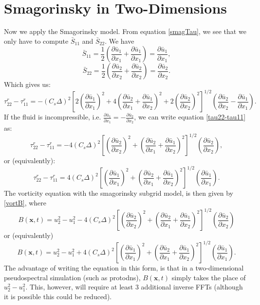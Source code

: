 \documentclass[11pt,a4paper]{article}
\begin{document}
\section{Smagorinsky in Two-Dimensions}
Now we apply the Smagorinsky model. From equation \ref{smagTau}, we see that we only have to compute $\bar{S}_{11}$ and $\bar{S}_{22}$. We have 
$$\bar{S}_{11} = \frac{1}{2}\left( \frac{\partial \bar{u}_1}{\partial x_1} + \frac{\partial \bar{u}_1}{\partial x_1}\right) = \frac{\partial \bar{u}_1}{\partial x_1},$$
$$\bar{S}_{22} = \frac{1}{2}\left( \frac{\partial \bar{u}_2}{\partial x_2} + \frac{\partial \bar{u}_2}{\partial x_2}\right) = \frac{\partial \bar{u}_2}{\partial x_2}.$$
Which gives us:
\begin{equation}\label{tau22-tau11}
\tau_{22}^r - \tau_{11}^r= -(C_s \Delta)^2\left[2\left( \frac{\partial \bar{u}_1}{\partial x_1}\right)^2+4\left( \frac{\partial \bar{u}_2}{\partial x_1} + \frac{\partial \bar{u}_1}{\partial x_2}\right)^2+2\left( \frac{\partial \bar{u}_2}{\partial x_2}\right)^2 \right]^{1/2}\left(\frac{\partial \bar{u}_2}{\partial x_2} - \frac{\partial \bar{u}_1}{\partial x_1}\right).
\end{equation}
If the fluid is incompressible, i.e. $\frac{\partial \bar{u}_1}{\partial x_1} = -\frac{\partial \bar{u}_2}{\partial x_2}$, we can write equation \ref{tau22-tau11} as:
$$\tau_{22}^r - \tau_{11}^r= -4(C_s \Delta)^2\left[\left( \frac{\partial \bar{u}_2}{\partial x_2}\right)^2+\left( \frac{\partial \bar{u}_2}{\partial x_1} + \frac{\partial \bar{u}_1}{\partial x_2}\right)^2 \right]^{1/2}\left(\frac{\partial \bar{u}_2}{\partial x_2}\right),$$
or (equivalently):
$$\tau_{22}^r - \tau_{11}^r= 4(C_s \Delta)^2\left[\left( \frac{\partial \bar{u}_1}{\partial x_1}\right)^2+\left( \frac{\partial \bar{u}_2}{\partial x_1} + \frac{\partial \bar{u}_1}{\partial x_2}\right)^2 \right]^{1/2}\left(\frac{\partial \bar{u}_1}{\partial x_1}\right).$$
The vorticity equation with the smagorinsky subgrid model, is then given by \ref{vortB}, where
$$B(\boldsymbol{x}, t) = u_2^2-u_1^2-4(C_s \Delta)^2\left[\left( \frac{\partial \bar{u}_2}{\partial x_2}\right)^2+\left( \frac{\partial \bar{u}_2}{\partial x_1} + \frac{\partial \bar{u}_1}{\partial x_2}\right)^2 \right]^{1/2}\left(\frac{\partial \bar{u}_2}{\partial x_2}\right)$$
or (equivalently)
$$B(\boldsymbol{x}, t) = u_2^2-u_1^2+4(C_s \Delta)^2\left[\left( \frac{\partial \bar{u}_1}{\partial x_1}\right)^2+\left( \frac{\partial \bar{u}_2}{\partial x_1} + \frac{\partial \bar{u}_1}{\partial x_2}\right)^2 \right]^{1/2}\left(\frac{\partial \bar{u}_1}{\partial x_1}\right).$$
The advantage of writing the equation in this form, is that in a two-dimensional pseudospectral simulation (such as protodns), $B(\boldsymbol{x},t)$ simply takes the place of $u_2^2 - u_1^2$. This, however, will require at least 3 additional inverse FFTs (although it is possible this could be reduced).
\end{document}
